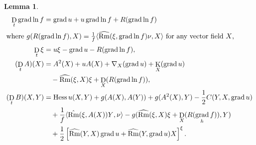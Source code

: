 \documentclass{amsart}
\newtheorem{lemma}[theorem]{Lemma}
\theoremstyle{definition}
\theoremstyle{remark}
\newcommand{\ip}[2]{\ensuremath{\langle{#1},{#2}\rangle}}
\DeclareMathOperator{\grad}{grad}
\DeclareMathOperator{\Rm}{Rm}
\DeclareMathOperator{\hess}{Hess}
\DeclareMathOperator{\diff}{K}
\DeclareMathOperator{\D}{D}
\numberwithin{equation}{section}
\begin{document}
\begin{lemma}
\label{lem:evolutions}
\begin{align*}
\D_t \grad \ln f &= \grad u + u \grad \ln f + R(\grad \ln f) \\
\intertext{where $g(R({\grad \ln f}), X) = \frac{1}{f} \ip{\widehat{\Rm}(\xi, \grad \ln f) \nu}{X}$ for any vector field $X$,}
\D_t \xi &= u\xi - \grad u - R(\grad \ln f), \\
(\D_t A)(X) &= A^2(X) + u A(X) + \nabla_X (\grad u) + \diff_X (\grad u) \\
&\quad - \widehat{\Rm} (\xi, X) \xi + \D_X (R(\grad \ln f)), \\
(\D_t B) (X, Y) &= \hess u (X, Y) + g(A(X), A(Y)) + g(A^2(X), Y) - \frac{1}{2} C(Y, X, \grad u) \\
&\quad +\frac{1}{f} \ip{\hat{\Rm} (\xi, A(X))Y}{\nu} - g(\widehat{\Rm}(\xi, X)\xi  + \D_X (R(\grad_h f)), Y) \\
&\quad + \frac{1}{2} \left[\widehat{\Rm} (Y, X)\grad u +  \widehat{\Rm} (Y, \grad u) X\right]^{\xi}.
\end{align*}
\end{lemma}
\end{document}
